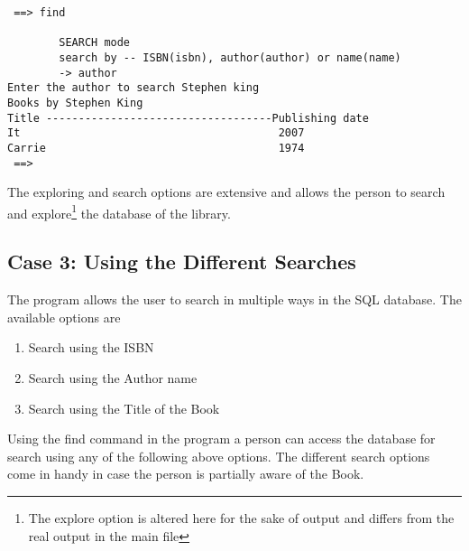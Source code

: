 \documentclass[12pt, a4paper, titlepage, openany]{report}
\begin{document}
{\begin{verbatim}
 ==> find

        SEARCH mode
        search by -- ISBN(isbn), author(author) or name(name)
        -> author
Enter the author to search Stephen king
Books by Stephen King
Title -----------------------------------Publishing date
It                                        2007
Carrie                                    1974
 ==> 
\end{verbatim}
}
The exploring and search options are extensive and allows the person to search and explore\footnote{The explore option is altered here for the sake of output and differs from the real output in the main file} the database of the library.
\newpage
\subsection{Case 3: Using the Different Searches}
The program allows the user to search in multiple ways in the SQL database. The available options are 
\begin{enumerate}
\item Search using the ISBN
\item Search using the Author name
\item Search using the Title of the Book
\end{enumerate}

Using the find command in the program a person can access the database for search using any of the following above options. The different search options come in handy in case the person is partially aware of the Book.
\end{document}
